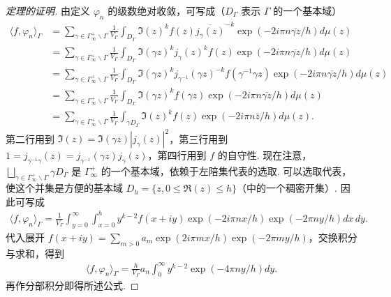 \begin{proof}[定理的证明]
由定义 $\varphi_n$ 的级数绝对收敛，可写成（$D_\Gamma$ 表示 $\Gamma$ 的一个基本域）
\begin{align*}
\langle f,\varphi_n\rangle_\Gamma
&=\sum_{\gamma\in\Gamma_\infty^+\backslash\Gamma}\frac1{V_\Gamma}\int_{D_\Gamma}\Im(z)^kf(z)\overline{j_\gamma(z)}^{-k}\exp(-2i\pi n\overline{\gamma z}/h)d\mu(z)\\
&=\sum_{\gamma\in\Gamma_\infty^+\backslash\Gamma}\frac1{V_\Gamma}\int_{D_\Gamma}\Im(\gamma z)^kj_\gamma(z)^kf(z)\exp(-2i\pi n\overline{\gamma z}/h)d\mu(z)\\
&=\sum_{\gamma\in\Gamma_\infty^+\backslash\Gamma}\frac1{V_\Gamma}\int_{D_\Gamma}\Im(\gamma z)^kj_{\gamma^{-1}}(\gamma z)^{-k}f(\gamma^{-1}\gamma z)\exp(-2i\pi n\overline{\gamma z}/h)d\mu(z)\\
&=\sum_{\gamma\in\Gamma_\infty^+\backslash\Gamma}\frac1{V_\Gamma}\int_{D_\Gamma}\Im(\gamma z)^kf(\gamma z)\exp(-2i\pi n\overline{\gamma z}/h)d\mu(z)\\
&=\sum_{\gamma\in\Gamma_\infty^+\backslash\Gamma}\frac1{V_\Gamma}\int_{\gamma D_\Gamma}\Im(z)^kf(z)\exp(-2i\pi n\bar z/h)d\mu(z).
\end{align*}
第二行用到 $\Im(z)=\Im(\gamma z)|j_\gamma(z)|^2$，第三行用到 $1=j_{\gamma^{-1}\gamma}(z)=j_{\gamma^{-1}}(\gamma z)j_\gamma(z)$，第四行用到 $f$ 的自守性. 现在注意，$\bigsqcup_{\gamma\in\Gamma_\infty^+\backslash\Gamma}\gamma D_\Gamma$ 是 $\Gamma_\infty^+$ 的一个基本域，依赖于左陪集代表的选取. 可以选取代表，使这个并集是方便的基本域 $D_h=\{z,0\leqslant\Re(z)\leqslant h\}$（中的一个稠密开集）. 因此可写成
\begin{align*}
\langle f,\varphi_n\rangle_\Gamma=\frac1{V_\Gamma}\int_{y=0}^\infty\int_{x=0}^h y^{k-2}f(x+iy)\exp(-2i\pi nx/h)\exp(-2\pi ny/h)dx\,dy.
\end{align*}
代入展开 $f(x+iy)=\sum_{m>0}a_m\exp(2i\pi mx/h)\exp(-2\pi my/h)$，交换积分与求和，得到
\begin{align*}
\langle f,\varphi_n\rangle_\Gamma=\frac h{V_\Gamma}a_n\int_0^\infty y^{k-2}\exp(-4\pi ny/h)dy.
\end{align*}
再作分部积分即得所述公式.
\end{proof}

